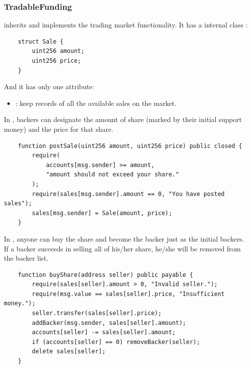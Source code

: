 \documentclass{article}
\begin{document}
\subsubsection{TradableFunding}
 inherits  and implements the trading market functionality. It has a internal class :
\begin{lstlisting}
    struct Sale {
        uint256 amount;
        uint256 price;
    }
\end{lstlisting}

And it has only one attribute:
\begin{itemize}
    \item {}: keep records of all the available sales on the market.
\end{itemize}

In , backers can designate the amount of share (marked by their initial support money) and the price for that share. 
\begin{lstlisting}
    function postSale(uint256 amount, uint256 price) public closed {
        require(
            accounts[msg.sender] >= amount,
            "amount should not exceed your share."
        );
        require(sales[msg.sender].amount == 0, "You have posted sales");
        sales[msg.sender] = Sale(amount, price);
    }
\end{lstlisting}

In , anyone can buy the share and become the backer just as the initial backers. If a backer succeeds in selling all of his/her share, he/she will be removed from the backer list.
\begin{lstlisting}
    function buyShare(address seller) public payable {
        require(sales[seller].amount > 0, "Invalid seller.");
        require(msg.value == sales[seller].price, "Insufficient money.");
        seller.transfer(sales[seller].price);
        addBacker(msg.sender, sales[seller].amount);
        accounts[seller] -= sales[seller].amount;
        if (accounts[seller] == 0) removeBacker(seller);
        delete sales[seller];
    }
\end{lstlisting}



\end{document}
